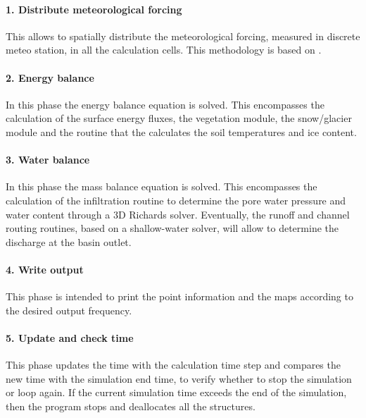 \paragraph {1. Distribute meteorological forcing}
This allows to spatially distribute the meteorological forcing, measured in discrete meteo station, in all the calculation cells. This methodology is based on \citet{liston2006meteorological}.

\paragraph{2. Energy balance}
In this phase the energy balance equation is solved. This encompasses the calculation of the surface energy fluxes, the vegetation module, the snow/glacier module and the routine that the calculates the soil temperatures and ice content.

\paragraph{3. Water balance}
In this phase the mass balance equation is solved. This encompasses the calculation of the infiltration routine to determine the pore water pressure and water content through a 3D Richards solver. Eventually, the runoff and channel routing routines, based on a shallow-water solver, will allow to determine the discharge at the basin outlet.

\paragraph{4. Write output}
This phase is intended to print the point information and the maps according to the desired output frequency.

\paragraph{5. Update and check time}
This phase updates the time with the calculation time step and compares the new time with the simulation end time, to verify whether to stop the simulation or loop again. If the current simulation time exceeds the end of the simulation, then the program stops and deallocates all the structures.


